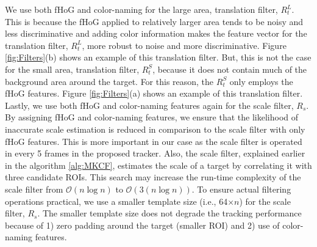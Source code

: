 \documentclass[10pt,twocolumn,letterpaper]{article}
\begin{document}
We use both fHoG \cite{felzenszwalb2010object} and color-naming
\cite{van2009learning} for the large area, translation filter,
$R_{t}^{L}$. This is because the fHoG applied to relatively larger
area tends to be noisy and less discriminative and adding color
information makes the feature vector for the translation filter,
$R_{t}^{L}$, more robust to noise and more discriminative. Figure
\ref{fig:Filters}(b) shows an example of this translation filter. But,
this is not the case for the small area, translation filter,
$R_{t}^{S}$, because it does not contain much of
the background area around the target. For this reason, the $R_{t}^{S}$ only
employs the fHoG features. Figure \ref{fig:Filters}(a)
shows an example of this translation filter. Lastly, we use both fHoG
and color-naming features again for the scale filter,
$R_{s}$. By assigning fHoG and color-naming features, we ensure
that the likelihood of inaccurate scale estimation is reduced in comparison to the scale filter
with only fHoG features. This is more important in our case as the scale filter is operated in every 5 frames
in the proposed tracker. Also, the scale filter, explained earlier in the
algorithm \ref{alg:MKCF}, estimates the scale of a target by
correlating it with three candidate ROIs. This search may increase the
run-time complexity of the scale filter from $\mathcal{O}(n\log n)$ to
$\mathcal{O}(3(n\log n))$. To ensure actual filtering operations
practical, we use a smaller template size (i.e., 64$\times n$) for the
scale filter, $R_{s}$. The smaller template size does not degrade the
tracking performance because of 1) zero padding around the
target (smaller ROI) and 2) use of color-naming features.
\end{document}
